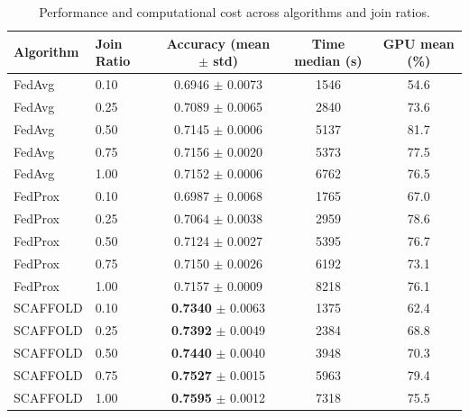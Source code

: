 \begin{table}[t]
\caption{Performance and computational cost across algorithms and join ratios.}
\label{tab:results}
\begin{tabular}{llccc}
\toprule
Algorithm & Join Ratio & Accuracy (mean $\pm$ std) & Time median (s) & GPU mean (\%) \\
\midrule
FedAvg & 0.10 & 0.6946 $\pm$ 0.0073 & 1546 & 54.6 \\
FedAvg & 0.25 & 0.7089 $\pm$ 0.0065 & 2840 & 73.6 \\
FedAvg & 0.50 & 0.7145 $\pm$ 0.0006 & 5137 & 81.7 \\
FedAvg & 0.75 & 0.7156 $\pm$ 0.0020 & 5373 & 77.5 \\
FedAvg & 1.00 & 0.7152 $\pm$ 0.0006 & 6762 & 76.5 \\
FedProx & 0.10 & 0.6987 $\pm$ 0.0068 & 1765 & 67.0 \\
FedProx & 0.25 & 0.7064 $\pm$ 0.0038 & 2959 & 78.6 \\
FedProx & 0.50 & 0.7124 $\pm$ 0.0027 & 5395 & 76.7 \\
FedProx & 0.75 & 0.7150 $\pm$ 0.0026 & 6192 & 73.1 \\
FedProx & 1.00 & 0.7157 $\pm$ 0.0009 & 8218 & 76.1 \\
SCAFFOLD & 0.10 & \textbf{0.7340} $\pm$ 0.0063 & 1375 & 62.4 \\
SCAFFOLD & 0.25 & \textbf{0.7392} $\pm$ 0.0049 & 2384 & 68.8 \\
SCAFFOLD & 0.50 & \textbf{0.7440} $\pm$ 0.0040 & 3948 & 70.3 \\
SCAFFOLD & 0.75 & \textbf{0.7527} $\pm$ 0.0015 & 5963 & 79.4 \\
SCAFFOLD & 1.00 & \textbf{0.7595} $\pm$ 0.0012 & 7318 & 75.5 \\
\bottomrule
\end{tabular}
\end{table}
